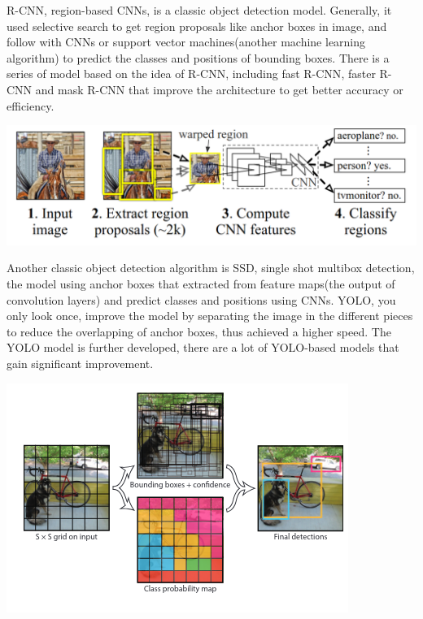                    R-CNN\cite{girshick2014rich}, region-based CNNs, is a classic object detection model. Generally, it used selective search to get region proposals like anchor boxes in image, and follow with CNNs or support vector machines(another machine learning algorithm) to predict the classes and positions of bounding boxes\cite{uijlings2013selective}. There is a series of model based on the idea of R-CNN, including fast R-CNN\cite{girshick2015fast}, faster R-CNN\cite{ren2015faster} and mask R-CNN\cite{he2017mask} that improve the architecture to get better accuracy or efficiency.
                    \begin{Figure}
                        \centering
                        \includegraphics[width=\linewidth]{Image/R-CNN.png}
                    \end{Figure}

                    Another classic object detection algorithm is SSD, single shot multibox detection\cite{liu2016ssd}, the model using anchor boxes that extracted from feature maps(the output of convolution layers) and predict classes and positions using CNNs. YOLO, you only look once, improve the model by separating the image in the different pieces to reduce the overlapping of anchor boxes, thus achieved a higher speed\cite{redmon2016you}. The YOLO model is further developed, there are a lot of YOLO-based models that gain significant improvement. 

                    \begin{Figure}
                        \centering
                        \includegraphics[width=\linewidth]{Image/YOLO.png}
                    \end{Figure}
                    
